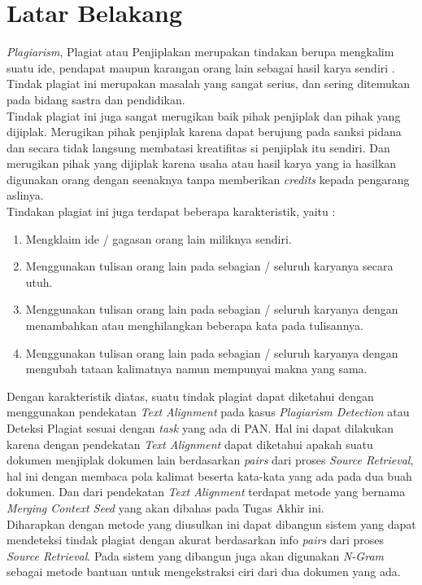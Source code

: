\documentclass[../Proposal.tex]{subfiles}
\begin{document}
	\section{Latar Belakang}
	\textit{Plagiarism}, Plagiat atau Penjiplakan merupakan tindakan berupa mengkalim suatu ide, pendapat maupun karangan orang lain sebagai hasil karya sendiri \cite{plagiat-kbbi}. Tindak plagiat ini merupakan masalah yang sangat serius, dan sering ditemukan pada bidang sastra dan pendidikan. \\ 
	
	\noindent Tindak plagiat ini juga sangat merugikan baik pihak penjiplak dan pihak yang dijiplak. Merugikan pihak penjiplak karena dapat berujung pada sanksi pidana dan secara tidak langsung membatasi kreatifitas si penjiplak itu sendiri. Dan merugikan pihak yang dijiplak karena usaha atau hasil karya yang ia hasilkan digunakan orang dengan seenaknya tanpa memberikan \textit{credits} kepada pengarang aslinya. \\ 
	
	Tindakan plagiat ini juga terdapat beberapa karakteristik, yaitu : 
	
	\begin{enumerate}
		\item Mengklaim ide / gagasan orang lain miliknya sendiri.
		\item Menggunakan tulisan orang lain pada sebagian / seluruh karyanya secara utuh.
		\item Menggunakan tulisan orang lain pada sebagian / seluruh karyanya dengan menambahkan atau menghilangkan beberapa kata pada tulisannya.
		\item Menggunakan tulisan orang lain pada sebagian / seluruh karyanya dengan mengubah tataan kalimatnya namun mempunyai makna yang sama.
	\end{enumerate}
	
	\noindent Dengan karakteristik diatas, suatu tindak plagiat dapat diketahui dengan menggunakan pendekatan \textit{Text Alignment} pada kasus \textit{Plagiarism Detection} atau Deteksi Plagiat sesuai dengan \textit{task} yang ada di PAN\cite{pan-task-2014}. Hal ini dapat dilakukan karena dengan pendekatan \textit{Text Alignment} dapat diketahui apakah suatu dokumen menjiplak dokumen lain berdasarkan \textit{pairs} dari proses \textit{Source Retrieval}, hal ini dengan membaca pola kalimat beserta kata-kata yang ada pada dua buah dokumen. Dan dari pendekatan \textit{Text Alignment} terdapat metode yang bernama \textit{Merging Context Seed} yang akan dibahas pada Tugas Akhir ini. \\
	
	\noindent Diharapkan dengan metode yang diusulkan ini dapat dibangun sistem yang dapat mendeteksi tindak plagiat dengan akurat berdasarkan info \textit{pairs} dari proses \textit{Source Retrieval}. Pada sistem yang dibangun juga akan digunakan \textit{N-Gram} sebagai metode bantuan untuk mengekstraksi ciri dari dua dokumen yang ada.
\end{document}

